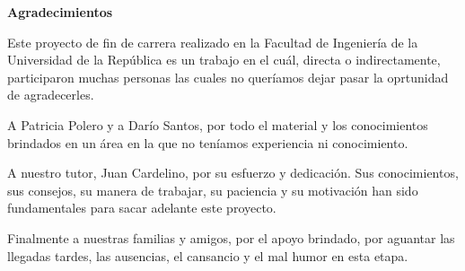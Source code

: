 \begin{center}
\textbf{Agradecimientos}
\end{center}

Este proyecto de fin de carrera realizado en la Facultad de Ingeniería de la Universidad de la República es un trabajo en el cuál, directa o indirectamente, participaron muchas personas las cuales no queríamos dejar pasar la oprtunidad de agradecerles.

A Patricia Polero y a Darío Santos, por todo el material y los conocimientos brindados en un área en la que no teníamos experiencia ni conocimiento.

A nuestro tutor, Juan Cardelino, por su esfuerzo y dedicación. Sus conocimientos, sus consejos, su manera de trabajar, su paciencia y su motivación han sido fundamentales para sacar adelante este proyecto.

Finalmente a nuestras familias y amigos, por el apoyo brindado, por aguantar las llegadas tardes, las ausencias, el cansancio y el mal humor en esta etapa.